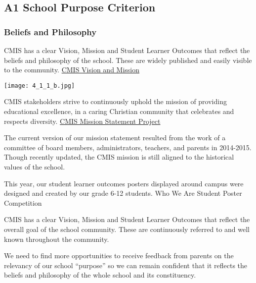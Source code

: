 \subsection{A1 School Purpose Criterion}
\subsubsection{Beliefs and Philosophy}



\begin{findings}
CMIS has a clear Vision, Mission and Student Learner Outcomes that reflect the beliefs and philosophy of the school. These are widely published and easily visible to the community. \href{http://cmis.ac.th/about/vision}{CMIS Vision and Mission}
 
{\centering\texttt{[image: 4\_1\_1\_b.jpg]}}

CMIS stakeholders strive to continuously uphold the mission of providing educational excellence, in a caring Christian community that celebrates and respects diversity. \href{https://docs.google.com/a/cmis.ac.th/presentation/d/1EJ3zT-xwUj2W--v5mTN6xWOqewtvhXrhTxXuoR1HyAg/edit?usp=sharing}{CMIS Mission Statement Project} 

The current version of our mission statement resulted from the work of a committee of board members, administrators, teachers, and parents in 2014-2015. Though recently updated, the CMIS mission is still aligned to the historical values of the school.

This year, our student learner outcomes posters displayed around campus were designed and created by our grade 6-12 students. Who We Are Student Poster Competition 


CMIS has a clear Vision, Mission and Student Learner Outcomes that reflect the overall goal of the school community. These are continuously referred to and well known throughout the community. 

We need to find more opportunities to receive feedback from parents on the relevancy of our school “purpose” so we can remain confident that it reflects the beliefs and philosophy of the whole school and its constituency.
\end{findings}

